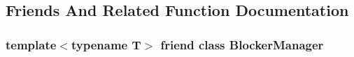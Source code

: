 \subsection{Friends And Related Function Documentation}
\hypertarget{classapollo_1_1cyber_1_1blocker_1_1Blocker_a125f26fb85cd399c64b22b95df83f810}{
\subsubsection[{Blocker\-Manager}]{\setlength{\rightskip}{0pt plus 5cm}template$<$typename T$>$ friend class {\bf Blocker\-Manager}\hspace{0.3cm}{\ttfamily [friend]}}}\label{classapollo_1_1cyber_1_1blocker_1_1Blocker_a125f26fb85cd399c64b22b95df83f810}


